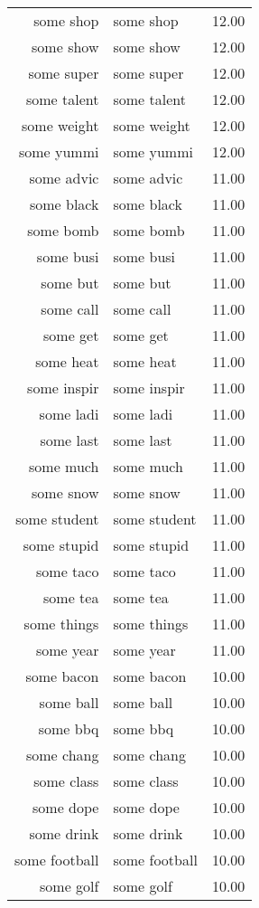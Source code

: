 \begin{table}[ht]
\begin{tabular}{rlr}
  some shop & some shop & 12.00 \\ 
  some show & some show & 12.00 \\ 
  some super & some super & 12.00 \\ 
  some talent & some talent & 12.00 \\ 
  some weight & some weight & 12.00 \\ 
  some yummi & some yummi & 12.00 \\ 
  some advic & some advic & 11.00 \\ 
  some black & some black & 11.00 \\ 
  some bomb & some bomb & 11.00 \\ 
  some busi & some busi & 11.00 \\ 
  some but & some but & 11.00 \\ 
  some call & some call & 11.00 \\ 
  some get & some get & 11.00 \\ 
  some heat & some heat & 11.00 \\ 
  some inspir & some inspir & 11.00 \\ 
  some ladi & some ladi & 11.00 \\ 
  some last & some last & 11.00 \\ 
  some much & some much & 11.00 \\ 
  some snow & some snow & 11.00 \\ 
  some student & some student & 11.00 \\ 
  some stupid & some stupid & 11.00 \\ 
  some taco & some taco & 11.00 \\ 
  some tea & some tea & 11.00 \\ 
  some things & some things & 11.00 \\ 
  some year & some year & 11.00 \\ 
  some bacon & some bacon & 10.00 \\ 
  some ball & some ball & 10.00 \\ 
  some bbq & some bbq & 10.00 \\ 
  some chang & some chang & 10.00 \\ 
  some class & some class & 10.00 \\ 
  some dope & some dope & 10.00 \\ 
  some drink & some drink & 10.00 \\ 
  some football & some football & 10.00 \\ 
  some golf & some golf & 10.00 \\ 

\end{tabular}
\end{table}
